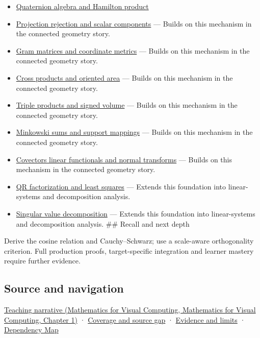 \begin{itemize}
\item
  \hyperref[appendix-965d9260eeab]{Quaternion algebra and Hamilton product}
\item
  \hyperref[appendix-505a502c372a]{Projection rejection and scalar components} --- Builds on this mechanism in the connected geometry story.
\item
  \hyperref[appendix-3b863809f82a]{Gram matrices and coordinate metrics} --- Builds on this mechanism in the connected geometry story.
\item
  \hyperref[appendix-2391db8052b1]{Cross products and oriented area} --- Builds on this mechanism in the connected geometry story.
\item
  \hyperref[appendix-5caa058bd9c7]{Triple products and signed volume} --- Builds on this mechanism in the connected geometry story.
\item
  \hyperref[appendix-215ac7099a82]{Minkowski sums and support mappings} --- Builds on this mechanism in the connected geometry story.
\item
  \hyperref[appendix-46da295c6787]{Covectors linear functionals and normal transforms} --- Builds on this mechanism in the connected geometry story.
\item
  \hyperref[appendix-c3421e6b4f2c]{QR factorization and least squares} --- Extends this foundation into linear-systems and decomposition analysis.
\item
  \hyperref[appendix-1fad5e7f36fa]{Singular value decomposition} --- Extends this foundation into linear-systems and decomposition analysis. \#\# Recall and next depth
\end{itemize}

Derive the cosine relation and Cauchy--Schwarz; use a scale-aware orthogonality criterion. Full production proofs, target-specific integration and learner mastery require further evidence.

\subsection{Source and navigation}\label{appendix-8bc4e8fc547c-source-and-navigation}

\href{../02-Mathematics-for-Visual-Computing/main.pdf\#nameddest=01-foundations-i-ch017-the-dot-product-turns-two-movements-into-a-measurement}{Teaching narrative (Mathematics for Visual Computing, Mathematics for Visual Computing, Chapter 1)} · \hyperref[appendix-fd090d982a15-phase-6---parts-501-600]{Coverage and source gap} · \hyperref[appendix-a103e7846d21-phase-6---source-analysis-and-verification]{Evidence and limits} · \hyperref[appendix-4ad47bdd269a]{Dependency Map}
